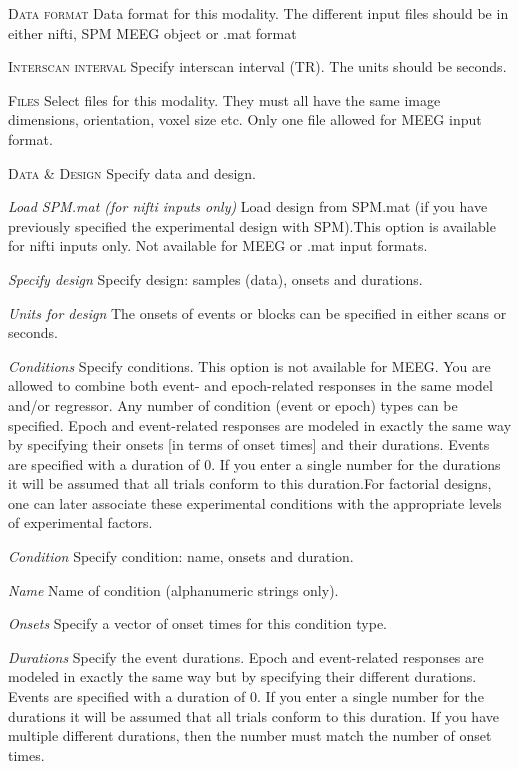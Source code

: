 \textsc{Data format}
Data format for this modality. The different input files should be in either nifti, SPM MEEG object or .mat format


\textsc{Interscan interval}
Specify interscan interval (TR). The units should be seconds.


\textsc{Files}
Select files for this modality. They must all have the same image dimensions, orientation, voxel size etc. Only one file allowed for MEEG input format.


\textsc{Data \& Design}
Specify data and design.


\textsl{Load SPM.mat (for nifti inputs only)}
Load design from SPM.mat (if you have previously specified the experimental design with SPM).This option is available for nifti inputs only. Not available for MEEG or .mat input formats.


\textsl{Specify design}
Specify design: samples (data), onsets and durations.


\textit{Units for design}
The onsets of events or blocks can be specified in either scans or seconds.


\textit{Conditions}
Specify conditions. This option is not available for MEEG. You are allowed to combine both event- and epoch-related responses in the same model and/or regressor. Any number of condition (event or epoch) types can be specified.  Epoch and event-related responses are modeled in exactly the same way by specifying their onsets [in terms of onset times] and their durations.  Events are specified with a duration of 0.  If you enter a single number for the durations it will be assumed that all trials conform to this duration.For factorial designs, one can later associate these experimental conditions with the appropriate levels of experimental factors.


\textit{Condition}
Specify condition: name, onsets and duration.


\textit{Name}
Name of condition (alphanumeric strings only).


\textit{Onsets}
Specify a vector of onset times for this condition type. 


\textit{Durations}
Specify the event durations. Epoch and event-related responses are modeled in exactly the same way but by specifying their different durations.  Events are specified with a duration of 0.  If you enter a single number for the durations it will be assumed that all trials conform to this duration. If you have multiple different durations, then the number must match the number of onset times.


